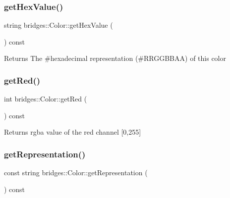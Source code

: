 \subsubsection{\texorpdfstring{get\+Hex\+Value()}{getHexValue()}}
{\footnotesize\ttfamily string bridges\+::\+Color\+::get\+Hex\+Value (\begin{DoxyParamCaption}{ }\end{DoxyParamCaption}) const\hspace{0.3cm}{\ttfamily [inline]}}

\begin{DoxyReturn}{Returns}
The \#hexadecimal representation (\#\+R\+R\+G\+G\+B\+B\+AA) of this color 
\end{DoxyReturn}
\mbox{\label{classbridges_1_1_color_a4c81e33854a6fdba9a3030e97ec8609e}} 
\subsubsection{\texorpdfstring{get\+Red()}{getRed()}}
{\footnotesize\ttfamily int bridges\+::\+Color\+::get\+Red (\begin{DoxyParamCaption}{ }\end{DoxyParamCaption}) const\hspace{0.3cm}{\ttfamily [inline]}}

\begin{DoxyReturn}{Returns}
rgba value of the red channel \mbox{[}0,255\mbox{]} 
\end{DoxyReturn}
\mbox{\label{classbridges_1_1_color_a7febf2d083d306060a5017d06abd6ec0}} 
\subsubsection{\texorpdfstring{get\+Representation()}{getRepresentation()}}
{\footnotesize\ttfamily const string bridges\+::\+Color\+::get\+Representation (\begin{DoxyParamCaption}{ }\end{DoxyParamCaption}) const\hspace{0.3cm}{\ttfamily [inline]}}


